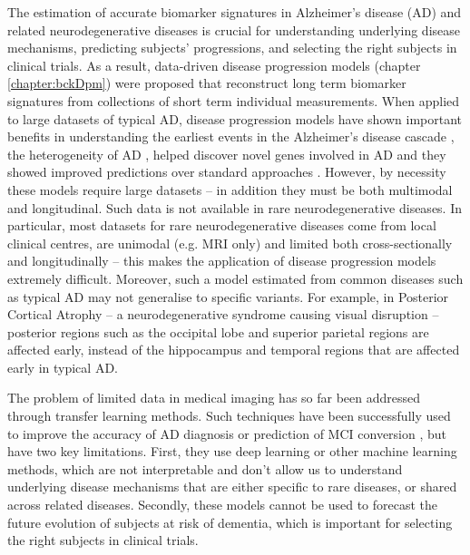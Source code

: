 The estimation of accurate biomarker signatures in Alzheimer's disease (AD) and related neurodegenerative diseases is crucial for understanding underlying disease mechanisms, predicting subjects' progressions, and selecting the right subjects in clinical trials. As a result, data-driven disease progression models (chapter \ref{chapter:bckDpm}) were proposed that reconstruct long term biomarker signatures from collections of short term individual measurements. When applied to large datasets of typical AD, disease progression models have shown important benefits in understanding the earliest events in the Alzheimer's disease cascade \cite{iturria2016early, young2014data}, the heterogeneity of AD \cite{young2018uncovering}, helped discover novel genes involved in AD \cite{scelsi2018genetic} and they showed improved predictions over standard approaches \cite{oxtoby2018}. However, by necessity these models require large datasets -- in addition they must be both multimodal and longitudinal. Such data is not available in rare neurodegenerative diseases. In particular, most datasets for rare neurodegenerative diseases come from local clinical centres, are unimodal (e.g. MRI only) and limited both cross-sectionally and longitudinally -- this makes the application of disease progression models extremely difficult.  Moreover, such a model estimated from common diseases such as typical AD may not generalise to specific variants. For example, in Posterior Cortical Atrophy -- a neurodegenerative syndrome causing visual disruption -- posterior regions such as the occipital lobe and superior parietal regions are affected early, instead of the hippocampus and temporal regions that are affected early in typical AD. 

The problem of limited data in medical imaging has so far been addressed through transfer learning methods. Such techniques have been successfully used to improve the accuracy of AD diagnosis \cite{hon2017towards, cheng2017multi} or prediction of MCI conversion \cite{cheng2015domain}, but have two key limitations. First, they use deep learning or other machine learning methods, which are not interpretable and don't allow us to understand underlying disease mechanisms that are either specific to rare diseases, or shared across related diseases. Secondly, these models cannot be used to forecast the future evolution of subjects at risk of dementia, which is important for selecting the right subjects in clinical trials. 

